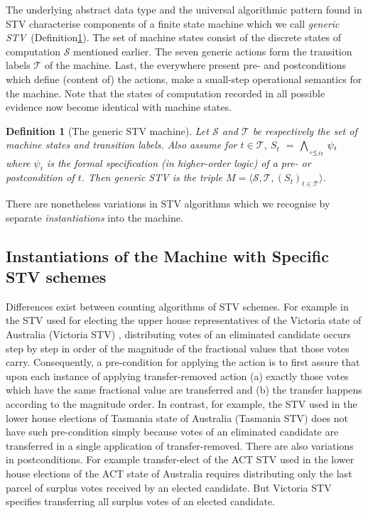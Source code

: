 \documentclass[10pt,conference]{IEEEtran}
\newtheorem{definition}{Definition}
\begin{document}
The underlying abstract data type and the universal algorithmic pattern found in STV characterise components of a finite state machine which we call \emph{generic STV}~(Definition\ref{STVMachine}). The set of machine states consist of the discrete states of computation $\mathcal{S}$ mentioned earlier. The seven generic actions form the transition labels $\mathcal{T}$ of the machine. Last, the everywhere present pre- and postconditions which define (content of)  the actions, make a small-step operational semantics for the machine.  
Note that the states of computation recorded in all possible  evidence now become identical with machine states.


\begin{definition}[The generic STV machine]\label{STVMachine}
Let $\mathcal{S}$  and $\mathcal{T}$
be respectively the set of machine states and transition labels.  Also assume for $t\in\mathcal{T}$, $S_{t}$ $=$ $\bigwedge_{\atop{i\leq j_{t}}} \psi_{i}$ where  $\psi_{i}$ is the formal specification (in higher-order logic) of a pre- or postcondition of $t$. Then \emph{generic STV} is the triple $M = \langle \mathcal{S}, \mathcal{T}, (S_t)_{t \in \mathcal{T}} \rangle$.  
\end{definition}
There are nonetheless variations in STV algorithms  which we  recognise  by separate \emph{instantiations} into the machine.  
\subsection{Instantiations of the Machine with Specific STV schemes}
Differences exist between counting algorithms of STV schemes.  
 For example in the STV used for electing the upper house representatives of the Victoria state of Australia (Victoria STV) \cite{PV:2002:EA}, distributing votes of an eliminated candidate occurs step by step in order of the magnitude of the fractional values that those votes carry.  Consequently, a pre-condition for applying the action is to first assure that upon each instance of applying transfer-removed action (a) exactly those votes which have the same fractional value are transferred and (b) the transfer happens according to the magnitude order. In contrast, for example, the STV used in the lower house elections of Tasmania state of Australia (Tasmania STV) does not have such pre-condition simply because votes of an eliminated candidate are transferred in a single application of transfer-removed. There are also variations in postconditions. For example transfer-elect of the ACT STV \cite{ACT} used in the lower house elections of the ACT state of Australia requires distributing only the last parcel of surplus votes received by an elected candidate. But Victoria STV specifies transferring all surplus votes of an elected candidate.  
\end{document}

